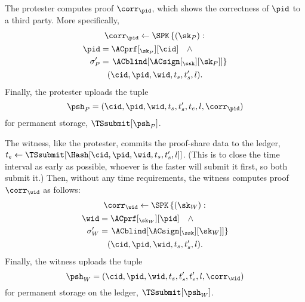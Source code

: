 The protester computes  proof \(\corr_{\pid}\), which shows the 
correctness of \(\pid\) to a third party.
More specifically,
\begin{multline*}
  \corr_{\pid}\gets \SPK\left\{ (\sk_P) : \right. \\
    \begin{aligned}
      \pid &= \ACprf[_{\sk_P}][\cid] \quad \land \\
      \sigma_P' &= \left. \ACblind[\ACsign[_{\ssk}][\sk_P]] \right\}
    \end{aligned} \\
      (\cid, \pid, \wid, t_s, t_s', l).
\end{multline*}
Finally, the protester uploads the tuple \[
  \psh_P = (\cid, \pid, \wid, t_s, t_s', t_e, l, \corr_{\pid})
\] for permanent storage, \(\TSsubmit[\psh_P]\).

The witness, like the protester, commits the proof-share data to the ledger, 
\(t_e\gets \TSsubmit[\Hash[\cid, \pid, \wid, t_s, t_s', l]]\).
(This is to close the time interval as early as possible, whoever is the faster 
will submit it first, so both submit it.) 
Then, without any time requirements, the witness computes  proof 
\(\corr_{\wid}\) as follows:
\begin{multline*}
  \corr_{\wid}\gets \SPK\left\{ (\sk_W) : \right. \\
    \begin{aligned}
      \wid &= \ACprf[_{\sk_W}][\pid] \quad \land \\
      \sigma_W' &= \left. \ACblind[\ACsign[_{\ssk}][\sk_W]] \right\}
    \end{aligned} \\
      (\cid, \pid, \wid, t_s, t_s', l).
\end{multline*}
Finally, the witness uploads the tuple \[
  \psh_W = (\cid, \pid, \wid, t_s, t_s', t_e', l, \corr_{\wid})
\] for permanent storage on the ledger, \(\TSsubmit[\psh_W]\).


